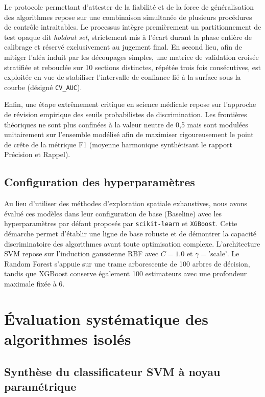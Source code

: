 Le protocole permettant d'attester de la fiabilité et de la force de généralisation des algorithmes repose sur une combinaison simultanée de plusieurs procédures de contrôle intraitables. Le processus intègre premièrement un partitionnement de test opaque dit \textit{holdout set}, strictement mis à l'écart durant la phase entière de calibrage et réservé exclusivement au jugement final. En second lieu, afin de mitiger l'aléa induit par les découpages simples, une matrice de validation croisée stratifiée et rebouclée sur 10 sections distinctes, répétée trois fois consécutives, est exploitée en vue de stabiliser l'intervalle de confiance lié à la surface sous la courbe (désigné \texttt{CV\_AUC}).

Enfin, une étape extrêmement critique en science médicale repose sur l'approche de révision empirique des seuils probabilistes de discrimination. Les frontières théoriques ne sont plus confinées à la valeur neutre de 0,5 mais sont modulées unitairement sur l'ensemble modélisé afin de maximiser rigoureusement le point de crête de la métrique F1 (moyenne harmonique synthétisant le rapport Précision et Rappel).

\subsection{Configuration des hyperparamètres}

Au lieu d'utiliser des méthodes d'exploration spatiale exhaustives, nous avons évalué ces modèles dans leur configuration de base (Baseline) avec les hyperparamètres par défaut proposés par \texttt{scikit-learn} et \texttt{XGBoost}. Cette démarche permet d'établir une ligne de base robuste et de démontrer la capacité discriminatoire des algorithmes avant toute optimisation complexe. L'architecture SVM repose sur l'induction gaussienne RBF avec $C = 1.0$ et $\gamma = \text{'scale'}$. Le Random Forest s'appuie sur une trame arborescente de 100 arbres de décision, tandis que XGBoost conserve également 100 estimateurs avec une profondeur maximale fixée à 6.

\section{Évaluation systématique des algorithmes isolés}

\subsection{Synthèse du classificateur SVM à noyau paramétrique}

